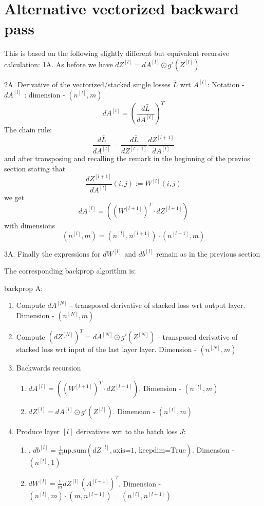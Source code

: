 \documentclass[10pt,a4paper]{article}
\begin{document}
  

\section{Alternative vectorized backward pass}
\label{sec:back1}
This is based on the following slightly different but equivalent recursive calculation:
1A. As before we have $ dZ^{[l]} =   dA^{[l]} \odot g'(Z^{[l]})   $

2A.  Derivative of the vectorized/stacked  single losses $\bar L$ wrt $A^{[l]}$: Notation - $dA^{[l]}$ : dimension - $(n^{[l]}, m) $   
\[dA^{[l]} = \left (\frac{d\bar L }{ d A^{[l]}} \right)^T \]
The chain rule:
\[   \frac{d\bar L }{ d A^{[l]}} = \frac{d\bar L }{ d Z^{[l+1]}} \frac{d Z^{[l+1]} }{ d A^{[l]}}  \]
and after transposing  and recalling the remark in the beginning of the previos section stating that 
\[ \frac{d Z^{[l+1]} }{ d A^{[l]}}(i,j) := W^{[l]}(i,j)  \] 
we get 
\[  dA^{[l]}  =  ( (W^{[l+1]})^T \cdot dZ^{[l+1]} )     \]
with dimensions 
\[ (n^{[l]},m) =  (n^{[l]},n^{[l+1]}) \cdot  (n^{[l+1]},m)  \]

3A. Finally the expressions for $d W^{[l]} $ and $d b^{[l]}$ remain as in the previous section


The corresponding backprop algorithm    is: 

backprop A:\\
\begin{enumerate}
\item Compute $dA^{[N]}$ - transposed derivative of stacked loss wrt output layer. Dimension -  $(n^{[N]}, m)$\\

\item Compute $(dZ^{[N]})^T=dA^{[N]}\odot g'(Z^{[N]})$ - transposed derivative of stacked loss wrt input of the last layer layer. Dimension -  $(n^{[N]}, m)$\\

\item Backwards recursion
\begin{enumerate}
\item  $  dA^{[l]}  =  ( (W^{[l+1]})^T \cdot dZ^{[l+1]} )   $.  Dimension -  $(n^{[l]}, m)$\\

\item  $  dZ^{[l]} =   dA^{[l]} \odot g'(Z^{[l]})   $.  Dimension -  $(n^{[l]}, m)$\\
 \end{enumerate} 
\item Produce layer $[l]$ derivatives wrt to the batch loss $J$:\\
\begin{enumerate}

\item. $db^{[l]} =   \frac{1}{m}\text{np.sum}(dZ^{[l]}, \text{axis=1, keepdim=True})$.   Dimension -  $(n^{[l]}, 1)$\\

\item $  dW^{[l]} = \frac{1}{m} dZ^{[l]}  (A^{[l-1]})^T$.  Dimension -  $(n^{[l]}, m) \cdot (m,n^{[l-1]}) =(n^{[l]}, n^{[l-1]})$\\
  \end{enumerate} 
 \end{enumerate} 
 
\end{document}
